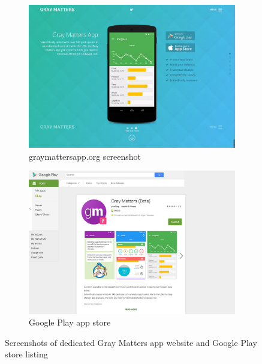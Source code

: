 \begin{figure}[h]
    \centering
    \begin{subfigure}[t]{0.48\textwidth}
        \centering
        \includegraphics[width=\textwidth]{Files/prevention-study-3/figures/graymatters-web}
        \caption{graymattersapp.org screenshot}
        \label{fig: gm-web}
    \end{subfigure}
    \hfill
    \begin{subfigure}[t]{0.48\textwidth}
        \centering
        \includegraphics[width=\textwidth]{Files/prevention-study-3/figures/graymatters-playstore}
        \caption{Google Play app store}
        \label{fig: gm-playstore}
    \end{subfigure}
    \caption{Screenshots of dedicated Gray Matters app website and Google Play store listing}
    \label{fig: graymatters-online}
\end{figure}

